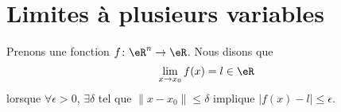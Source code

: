


\section{Limites à plusieurs variables}
\label{SecLimVarsPlus}

Prenons une fonction $f\colon \eR^n\to \eR$. Nous disons que
\begin{equation}
    \lim_{x\to x_0}f(x)=l\in\eR
\end{equation}
lorsque $\forall \epsilon>0$, $\exists\delta$ tel que $\| x-x_0 \|\leq\delta$ implique $| f(x)-l |\leq \epsilon$.

